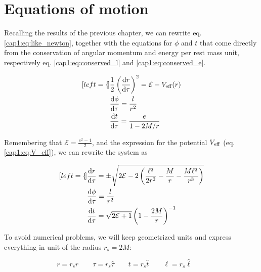 
\section{Equations of motion}
\label{cap2:sec:eq_of_motion}

Recalling the results of the previous chapter, we can rewrite eq.
\ref{cap1:eq:like_newton}, together with the equations for $\phi$ and $t$ that
come directly from the conservation of angular momentum and energy per rest mass
unit, respectively eq. \ref{cap1:eq:conserved_l} and
\ref{cap1:eq:conserved_e}.

\begin{subequations}
	\begin{align}[left = {\empheqlbrace}]
        &\frac{1}{2} \left(\dv{r}{\tau}\right)^2 = \mathcal E - V_{\rm eff} (r)
        \\
        &\dv{\phi}{\tau} = \frac{l}{r^2} \\
        &\dv{t}{\tau} = \frac{e}{1 - 2 M / r}
	\end{align}
\end{subequations}

Remembering that $\mathcal E = \frac{e^2 - 1}{2}$, and the expression for the
potential $V_{\rm eff}$ (eq. \ref{cap1:eq:V_eff}), we can rewrite the system
as

\begin{subequations}
	\begin{align}[left = {\empheqlbrace}]
        &\dv{r}{\tau} = \pm \sqrt{2 \mathcal E - 2 \left(\frac{\ell^2}{2 r^2} 
        - \frac{M}{r} - \frac{M \ell^2}{r^3} \right)} \label{cap2:eq:radial_eq} \\
        &\dv{\phi}{\tau} = \frac{l}{r^2} \label{cap2:eq:angular_eq} \\
        &\dv{t}{\tau} = \sqrt{2 \mathcal E + 1}\left(1 - \frac{2 M}{r} \right)^{-1}
	\end{align}
\label{cap2:eq:eq_of_motion}
\end{subequations}

To avoid numerical problems, we will keep geometrized units and express
everything in unit of the \Sh radius $r_s = 2 M$:

\begin{equation}
    r = r_s \hat r \quad \quad
    \tau = r_s \hat \tau \quad \quad
    t = r_s \hat t \quad \quad
    \ell = r_s \hat \ell \quad \quad
\end{equation}

